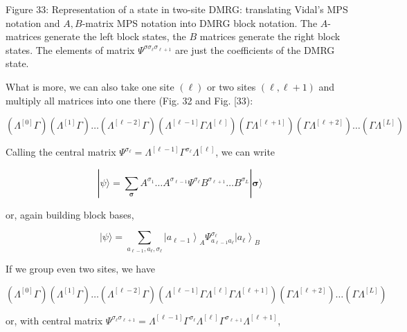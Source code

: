 \documentclass[12pt]{article}
\begin{document}
Figure 33: Representation of a state in two-site DMRG: translating Vidal's MPS notation and $A, B$-matrix MPS notation into DMRG block notation. The $A$-matrices generate the left block states, the $B$ matrices generate the right block states. The elements of matrix $\Psi^{\sigma \sigma_{\ell} \sigma_{\ell+1}}$ are just the coefficients of the DMRG state.

What is more, we can also take one site $(\ell)$ or two sites $(\ell, \ell+1)$ and multiply all matrices into one there (Fig. 32 and Fig. [33):


\begin{equation*}
\left(\Lambda^{[0]} \Gamma\right)\left(\Lambda^{[1]} \Gamma\right) \ldots\left(\Lambda^{[\ell-2]} \Gamma\right)\left(\Lambda^{[\ell-1]} \Gamma \Lambda^{[\ell]}\right)\left(\Gamma \Lambda^{[\ell+1]}\right)\left(\Gamma \Lambda^{[\ell+2]}\right) \ldots\left(\Gamma \Lambda^{[L]}\right) \tag{170}
\end{equation*}


Calling the central matrix $\Psi^{\sigma_{\ell}}=\Lambda^{[\ell-1]} \Gamma^{\sigma_{\ell}} \Lambda^{[\ell]}$, we can write


\begin{equation*}
|\psi\rangle=\sum_{\boldsymbol{\sigma}} A^{\sigma_{1}} \ldots A^{\sigma_{\ell-1}} \Psi^{\sigma_{\ell}} B^{\sigma_{\ell+1}} \ldots B^{\sigma_{L}}|\boldsymbol{\sigma}\rangle \tag{171}
\end{equation*}


or, again building block bases,


\begin{equation*}
|\psi\rangle=\sum_{a_{\ell-1}, a_{\ell}, \sigma_{\ell}}\left|a_{\ell-1}\right\rangle_{A} \Psi_{a_{\ell-1} a_{\ell}}^{\sigma_{\ell}}\left|a_{\ell}\right\rangle_{B} \tag{172}
\end{equation*}


If we group even two sites, we have


\begin{equation*}
\left(\Lambda^{[0]} \Gamma\right)\left(\Lambda^{[1]} \Gamma\right) \ldots\left(\Lambda^{[\ell-2]} \Gamma\right)\left(\Lambda^{[\ell-1]} \Gamma \Lambda^{[\ell]} \Gamma \Lambda^{[\ell+1]}\right)\left(\Gamma \Lambda^{[\ell+2]}\right) \ldots\left(\Gamma \Lambda^{[L]}\right) \tag{173}
\end{equation*}


or, with central matrix $\Psi^{\sigma_{\ell} \sigma_{\ell+1}}=\Lambda^{[\ell-1]} \Gamma^{\sigma_{\ell}} \Lambda^{[\ell]} \Gamma^{\sigma_{\ell+1}} \Lambda^{[\ell+1]}$,
\end{document}
